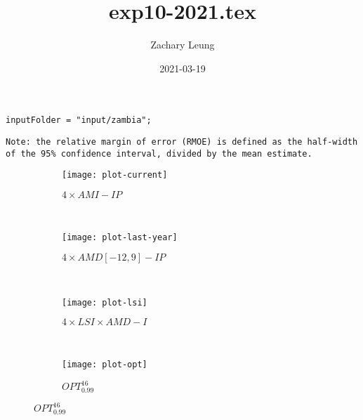 \documentclass{article}
\title{exp10-2021.tex}
\author{Zachary Leung}
\date{2021-03-19}
\begin{document}
\maketitle


\begin{verbatim}
inputFolder = "input/zambia";
\end{verbatim}

\begin{verbatim}
Note: the relative margin of error (RMOE) is defined as the half-width
of the 95% confidence interval, divided by the mean estimate.
\end{verbatim}

\clearpage

\begin{figure}[h!]
    \begin{subfigure}[t]{0.48\textwidth}
        \caption{$4 \times AMI - IP$}
        \texttt{[image: plot-current]}
    \end{subfigure}%
    ~~~~~
    \begin{subfigure}[t]{0.48\textwidth}
        \caption{$4 \times AMD[-12,9]-IP$}
        \texttt{[image: plot-last-year]}
    \end{subfigure}%
    \\[5mm]
    \begin{subfigure}[t]{0.48\textwidth}
        \caption{$4 \times LSI\times AMD - I$}
        \texttt{[image: plot-lsi]}
    \end{subfigure}%
    ~~~~~
    \begin{subfigure}[t]{0.48\textwidth}
        \caption{$OPT^{16}_{0.99}$}
        \texttt{[image: plot-opt]}
    \end{subfigure}%
\end{figure}
\end{document}
